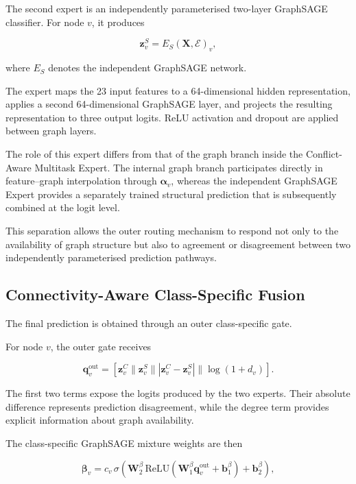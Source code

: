 \documentclass{ieeeaccess}
\begin{document}
The second expert is an independently parameterised two-layer GraphSAGE classifier. For node \(v\), it produces

\begin{equation}
\mathbf{z}^{S}_v
=
E_S(\mathbf{X},\mathcal{E})_v,
\end{equation}

where \(E_S\) denotes the independent GraphSAGE network.

The expert maps the 23 input features to a 64-dimensional hidden representation, applies a second 64-dimensional GraphSAGE layer, and projects the resulting representation to three output logits. ReLU activation and dropout are applied between graph layers.

The role of this expert differs from that of the graph branch inside the Conflict-Aware Multitask Expert. The internal graph branch participates directly in feature--graph interpolation through \(\boldsymbol{\alpha}_v\), whereas the independent GraphSAGE Expert provides a separately trained structural prediction that is subsequently combined at the logit level.

This separation allows the outer routing mechanism to respond not only to the availability of graph structure but also to agreement or disagreement between two independently parameterised prediction pathways.


\subsection{Connectivity-Aware Class-Specific Fusion}

The final prediction is obtained through an outer class-specific gate.

For node \(v\), the outer gate receives

\begin{equation}
\mathbf{q}^{\mathrm{out}}_v
=
\left[
\mathbf{z}^{C}_v
\parallel
\mathbf{z}^{S}_v
\parallel
\left|
\mathbf{z}^{C}_v-\mathbf{z}^{S}_v
\right|
\parallel
\log(1+d_v)
\right].
\label{eq:outer_gate_input}
\end{equation}

The first two terms expose the logits produced by the two experts. Their absolute difference represents prediction disagreement, while the degree term provides explicit information about graph availability.

The class-specific GraphSAGE mixture weights are then

\begin{equation}
\boldsymbol{\beta}_v
=
c_v\,
\sigma
\left(
\mathbf{W}^{\beta}_2
\,
\mathrm{ReLU}
\left(
\mathbf{W}^{\beta}_1
\mathbf{q}^{\mathrm{out}}_v
+
\mathbf{b}^{\beta}_1
\right)
+
\mathbf{b}^{\beta}_2
\right),
\label{eq:outer_gate}
\end{equation}
\end{document}
